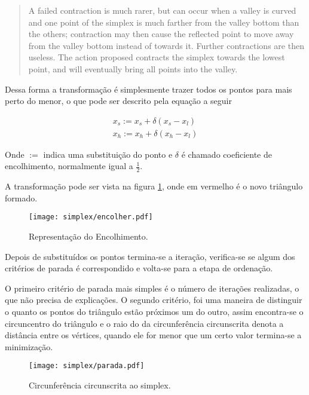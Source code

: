 \begin{quote}
A failed contraction is much rarer, but can occur when a valley is curved and one point of the simplex is much farther from the valley bottom than the others; contraction may then cause the reflected point to move away from the valley bottom instead of towards it. Further contractions are then useless. The action proposed contracts the simplex towards the lowest point, and will eventually bring all points into the valley.
\end{quote}

Dessa forma a transformação é simplesmente trazer todos os pontos para mais perto do menor, o que pode ser descrito pela equação a seguir

\begin{subequations}
\begin{align}
x_s:=x_s+\delta (x_s-x_l)\\
x_h:=x_h+\delta (x_h-x_l)
\end{align}
\end{subequations} 

Onde $:=$ indica uma substituição do ponto e $\delta$ é chamado coeficiente de encolhimento, normalmente igual a $\frac{1}{2}$.

A transformação pode ser vista na figura \ref{fig:encolher}, onde em vermelho é o novo triângulo formado.

\begin{figure}[h]
	\begin{center}	
		\texttt{[image: simplex/encolher.pdf]}
		\caption{Representação do Encolhimento.}
		\label{fig:encolher}
	\end{center}
\end{figure}

Depois de substituídos os pontos termina-se a iteração, verifica-se se algum dos critérios de parada é correspondido e volta-se para a etapa de ordenação.

\pagebreak
{}

O primeiro critério de parada mais simples é o número de iterações realizadas, o que não precisa de explicações.
O segundo critério, foi uma maneira de distinguir o quanto os pontos do triângulo estão próximos um do outro, assim
encontra-se o circuncentro do triângulo e o raio do da circunferência circunscrita denota a distância entre os vértices, quando ele for menor que um certo valor termina-se a minimização.

\begin{figure}[H]
	\begin{center}	
		\texttt{[image: simplex/parada.pdf]}
		\caption{Circunferência circunscrita ao simplex.}
		\label{fig:parada}
	\end{center}
\end{figure}


